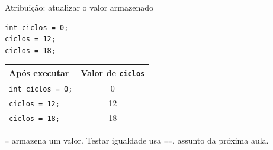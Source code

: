 \begin{frame}[fragile]{Atribuição: atualizar o valor armazenado}
\begin{lstlisting}
int ciclos = 0;
ciclos = 12;
ciclos = 18;
\end{lstlisting}
\begin{center}
\begin{tabular}{lc}
\toprule
Após executar & Valor de \texttt{ciclos} \\
\midrule
\texttt{int ciclos = 0;} & 0 \\
\texttt{ciclos = 12;} & 12 \\
\texttt{ciclos = 18;} & 18 \\
\bottomrule
\end{tabular}
\end{center}
\texttt{=} armazena um valor. Testar igualdade usa \texttt{==}, assunto da próxima aula.
\end{frame}
